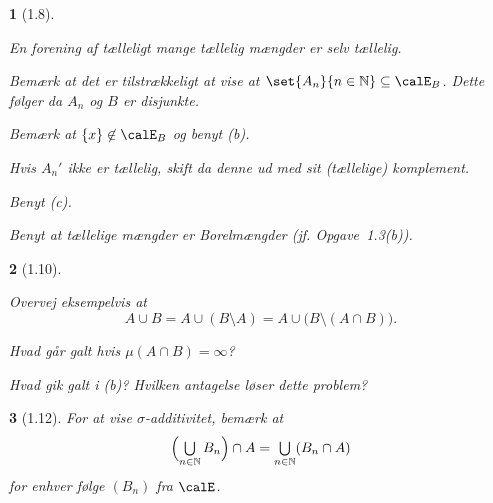 \documentclass[a4paper, 11pt, article, danish, oneside]{memoir}
\title{\doctitle}
\author{\docauthor}
\newcommand{\naturals}{\mathbb{N}}
\newcommand*\union\cup
\newcommand*\intersect\cap
\DeclareMathOperator*{\smallbigcup}{\textstyle\bigcup}
\DeclareMathOperator*{\bigunion}{\mathchoice
    {\smallbigcup}%
    {\bigcup}%
    {\bigcup}%
    {\bigcup}%
}
\newcommand{\pencilsymbol}{\raisebox{-2pt}{\normalfont\PencilLeft}}
\theoremstyle{changedotcustomnumber}
\theoremstyle{changedotbreakcustomnumber}
\newtheorem{opgavebreak}{\pencilsymbol}
\begin{document}
\maketitle

\begin{opgavebreak}[1.8]
\begin{solutionsec}
    \item En forening af tælleligt mange tællelig mængder er selv tællelig.

    \item Bemærk at det er tilstrækkeligt at vise at $\set{A_n}{n \in \naturals} \subseteq \calE_B$. Dette følger da $A_n$ og $B$ er disjunkte.
    
    \item Bemærk at $\{x\} \not\in \calE_B$ og benyt (b).

    \item Hvis $A_n'$ ikke er tællelig, skift da denne ud med sit (tællelige) komplement.

    \item Benyt (c).

    \item Benyt at tællelige mængder er Borelmængder (jf. Opgave~1.3(b)).
\end{solutionsec}
\end{opgavebreak}


\begin{opgavebreak}[1.10]
\begin{solutionsec}
    \item Overvej eksempelvis at
    \begin{equation*}
        A \union B
            = A \union (B \setminus A)
            = A \union \bigl( B \setminus (A \intersect B) \bigr).
    \end{equation*}

    \item Hvad går galt hvis $\mu(A \intersect B) = \infty$?

    \item Hvad gik galt i (b)? Hvilken antagelse løser dette problem?
\end{solutionsec}
\end{opgavebreak}


\begin{opgavebreak}[1.12]
    For at vise $\sigma$-additivitet, bemærk at
    \begin{equation*}
        \Bigl( \bigunion_{n \in \naturals} B_n \Bigr) \intersect A
            = \bigunion_{n \in \naturals} (B_n \intersect A)
    \end{equation*}
    for enhver følge $(B_n)$ fra $\calE$.
\end{opgavebreak}
\end{document}
